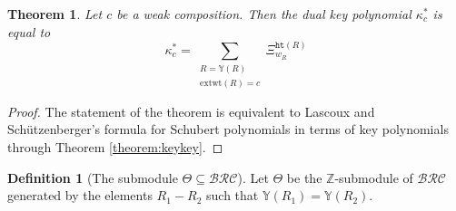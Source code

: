 \documentclass{amsart}
\newtheorem{proposition}[lemma]{Proposition}
\newtheorem{theorem}{Theorem}[section]
\theoremstyle{definition}
\newtheorem{definition}[lemma]{Definition}
\theoremstyle{remark}
\numberwithin{equation}{subsection}
\newcommand{\wof}[1]{w_{#1}}
\newcommand{\wtt}{\mathtt{wt}}
\newcommand{\hr}{\mathtt{ht}}
\newcommand{\BRC}{\mathcal{BRC}}
\newcommand{\RC}{\mathcal{RC}}
\newcommand{\dsch}{\ensuremath{\Xi}}
\begin{document}
\begin{theorem} \label{theorem:keyformula}
  Let $c$ be a weak composition. Then the dual key polynomial $\kappa^*_c$ is equal to
$$\kappa^*_c = \sum_{\substack{R=\mathbb{Y}(R)\\ \mathrm{extwt}(R)=c}} \dsch_{\wof{R}}^{\hr(R)}$$
\end{theorem}
\begin{proof}
  The statement of the theorem is equivalent to Lascoux and Sch\"utzenberger's formula for Schubert polynomials in terms of key polynomials through Theorem \ref{theorem:keykey}.
\end{proof}


\begin{definition}[The submodule $\Theta\subseteq \BRC$]\label{definition:theta}
  Let $\Theta$ be the $\mathbb{Z}$-submodule of $\BRC$ generated by the elements $R_1-R_2$ such that $\mathbb{Y}(R_1)=\mathbb{Y}(R_2)$.

\end{definition}
\end{document}
